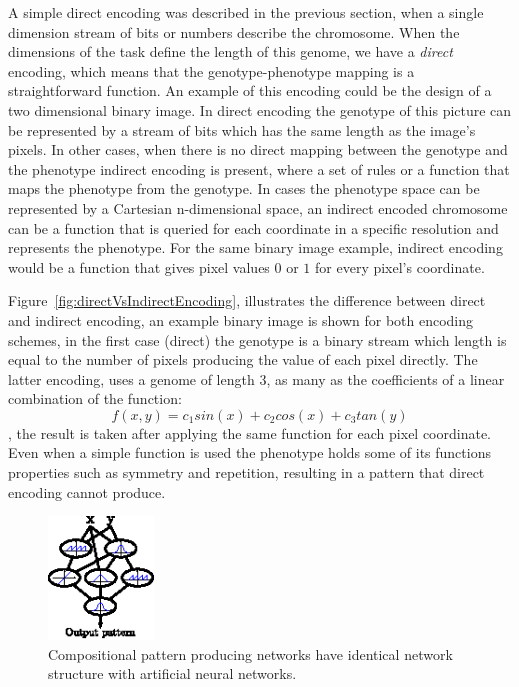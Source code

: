 A simple direct encoding was described in the previous section, when a single dimension stream of bits or numbers describe the chromosome. When the dimensions of the task define the length of this genome, we have a \emph{direct} encoding, which means that the genotype-phenotype mapping is a straightforward function. An example of this encoding could be the design of a two dimensional binary image. In direct encoding the genotype of this picture can be represented by a stream of bits which has the same length as the image's pixels. In other cases, when there is no direct mapping between the genotype and the phenotype indirect encoding is present, where a set of rules or a function that maps the phenotype from the genotype. In cases the phenotype space can be represented by a Cartesian n-dimensional space, an indirect encoded chromosome can be a function that is queried for each coordinate in a specific resolution and represents the phenotype. For the same binary image example, indirect encoding would be a function that gives pixel values $0$ or $1$ for every pixel's coordinate. 



Figure~\ref{fig:directVsIndirectEncoding}, illustrates the difference between direct and indirect encoding, an example binary image is shown for both encoding schemes, in the first case (direct) the genotype is a binary stream which length is equal to the number of pixels producing the value of each pixel directly. The latter encoding, uses a genome of length 3, as many as the coefficients of a linear combination of the function: 
\[f(x,y) = c_1 sin(x) + c_2 cos(x) + c_3 tan(y)
\], the result is taken after applying the same function for each pixel coordinate. Even when a simple function is used the  phenotype holds some of its functions properties such as symmetry and repetition, resulting in a pattern that direct encoding cannot produce.


\begin{figure}[t!]
\centering
\includegraphics[width=0.25\textwidth]{../Figures/Misc/cppnNetwork.eps}
\caption{Compositional pattern producing networks have identical network structure with artificial neural networks.}
\label{fig:cppnNetwork}
\end{figure}



